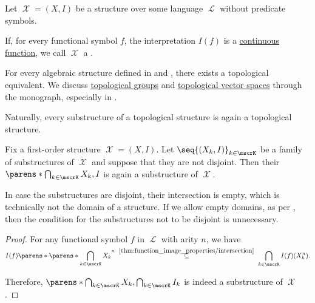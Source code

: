 \begin{remark}\label{rem:topological_first_order_structures}
  Let \( \mscrX = (X, I) \) be a structure over some language \( \mscrL \) without predicate symbols.

  If, for every functional symbol \( f \), the interpretation \( I(f) \) is a \hyperref[def:global_continuity]{continuous function}, we call \( \mscrX \) a .

  For every algebraic structure defined in  and , there exists a topological equivalent. We discuss \hyperref[def:topological_group]{topological groups} and \hyperref[def:topological_vector_space]{topological vector spaces} through the monograph, especially in .

  Naturally, every substructure of a topological structure is again a topological structure.
\end{remark}

\begin{proposition}\label{thm:intersection_substructure}
  Fix a first-order structure \( \mscrX = (X, I) \). Let \( \seq{ (X_k, I) }_{k \in \mscrK} \) be a family of substructures of \( \mscrX \) and suppose that they are not disjoint. Then their  \( \parens*{\bigcap_{k \in \mscrK} X_k, I} \) is again a substructure of \( \mscrX \).
\end{proposition}
\begin{comments}
  \item In case the substructures are disjoint, their intersection is empty, which is technically not the domain of a structure. If we allow empty domains, as per , then the condition for the substructures not to be disjoint is unnecessary.
\end{comments}
\begin{proof}
  For any functional symbol \( f \) in \( \mscrL \) with arity \( n \), we have
  \begin{equation*}
    I(f)\parens*{\parens*{\bigcap_{\smash{k \in \mscrK}} X_k}^n}
    \reloset {\ref{thm:function_image_properties/intersection}} \subseteq
    \bigcap_{k \in \mscrK} I(f)(X_k^n).
  \end{equation*}

  Therefore, \( \parens*{\bigcap_{k \in \mscrK} X_k, \bigcap_{k \in \mscrK} I_k} \) is indeed a substructure of \( \mscrX \).
\end{proof}

